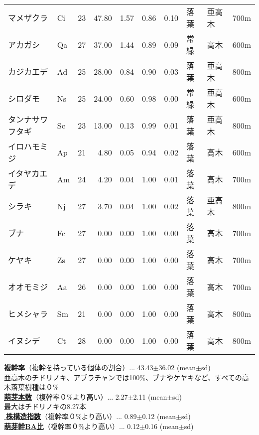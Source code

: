 \documentclass[a0, 30pt, plainboxedsections]{sciposter} %
\begin{document}
\begin{multicols}{2}
\begin{mdframed}[style=subsection.frame,frametitle={\huge\textbf{\color{Black1}{\LARGE{\ding{192}}\Large{25種の株構造は種間で大きく異なる}}}}]
\begin{wraptable}{r}{14.5em}
{\begin{tabular}{llrrrrrlll}
マメザクラ & Ci &  23 & 47.80 & 1.57 & 0.86 & 0.10 & 落葉 & 亜高木 & 700m \\ 
アカガシ & Qa &  27 & 37.00 & 1.44 & 0.89 & 0.09 & 常緑 & 高木 & 600m \\ 
カジカエデ & Ad &  25 & 28.00 & 0.84 & 0.90 & 0.03 & 落葉 & 亜高木 & 800m \\ 
シロダモ & Ns &  25 & 24.00 & 0.60 & 0.98 & 0.00 & 常緑 & 亜高木 & 600m \\ 
タンナサワフタギ & Sc &  23 & 13.00 & 0.13 & 0.99 & 0.01 & 落葉 & 亜高木 & 800m \\ 
イロハモミジ & Ap &  21 & 4.80 & 0.05 & 0.94 & 0.02 & 落葉 & 高木 & 600m \\ 
イタヤカエデ & Am &  24 & 4.20 & 0.04 & 1.00 & 0.01 & 落葉 & 高木 & 700m \\ 
シラキ & Nj &  27 & 3.70 & 0.04 & 1.00 & 0.02 & 落葉 & 亜高木 & 800m \\ 
\rowcolor{Blue2!30}ブナ & Fc &  27 & 0.00 & 0.00 & 1.00 & 0.00 & 落葉 & 高木 & 700m \\ 
\rowcolor{Blue2!30}ケヤキ & Zs &  27 & 0.00 & 0.00 & 1.00 & 0.00 & 落葉 & 高木 & 700m \\ 
\rowcolor{Blue2!30}オオモミジ & Aa &  26 & 0.00 & 0.00 & 1.00 & 0.00 & 落葉 & 高木 & 700m \\ 
\rowcolor{Blue2!30}ヒメシャラ & Sm &  21 & 0.00 & 0.00 & 1.00 & 0.00 & 落葉 & 高木 & 800m \\ 
\rowcolor{Blue2!30}イヌシデ & Ct &  28 & 0.00 & 0.00 & 1.00 & 0.00 & 落葉 & 高木 & 800m \\ 
   \hline
\end{tabular}}
\end{wraptable}

\textbf{\underline{複幹率}}{\footnotesize（複幹を持っている個体の割合）}... 43.43$\pm$36.02 (mean$\pm$sd)\\
{\scriptsize 亜高木のチドリノキ、アブラチャンでは100\%、ブナやケヤキなど、すべての高木落葉樹種は０\%}\\
\textbf{\underline{萌芽本数}}{\footnotesize（複幹率０\%より高い）}... 2.27$\pm$2.11 (mean$\pm$sd)\\
{\scriptsize 最大はチドリノキの8.27本}\\
\textbf{\underline{株構造指数}}{\footnotesize（複幹率０\%より高い）}... 0.89$\pm$0.12 (mean$\pm$sd)\\
\textbf{\underline{萌芽幹BA比}}{\footnotesize（複幹率０\%より高い）}... 0.12$\pm$0.16 (mean$\pm$sd)

\end{mdframed}


\end{multicols}
\end{document}
